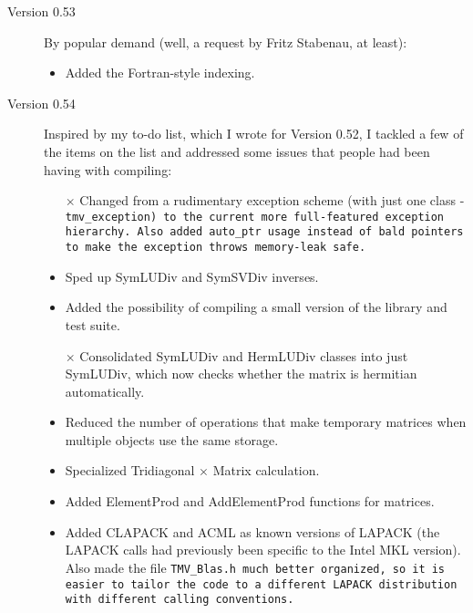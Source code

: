 \begin{description}
\item[Version 0.53]
By popular demand (well, a request by Fritz Stabenau, at least):
\begin{itemize}
\item
Added the Fortran-style indexing.
\end{itemize}

\item[Version 0.54]
Inspired by my to-do list, which I wrote for Version 0.52, I tackled a few of the 
items on the list and addressed some issues that people had been having
with compiling:
\begin{itemize}
\item[$\times$]
Changed from a rudimentary exception scheme (with just one class - 
\tt{tmv\_exception}) to the current more full-featured exception hierarchy.
Also added \tt{auto\_ptr} usage instead of bald pointers to make the 
exception throws memory-leak safe.
\item
Sped up SymLUDiv and SymSVDiv inverses.
\item
Added the possibility of compiling a small version of the library and test suite.
\item[$\times$]
Consolidated SymLUDiv and HermLUDiv classes into just SymLUDiv, which now checks
whether the matrix is hermitian automatically.  
\item
Reduced the number of operations that make temporary matrices when multiple
objects use the same storage. 
\item
Specialized Tridiagonal $\times$ Matrix calculation.
\item
Added ElementProd and AddElementProd functions for matrices.
\item
Added CLAPACK and ACML as known versions of LAPACK (the LAPACK calls
had previously been specific to the Intel MKL version).  Also made the file
\tt{TMV\_Blas.h} much better organized, so it is easier to tailor the code to 
a different LAPACK distribution with different calling conventions.

\end{itemize}


\end{description}
